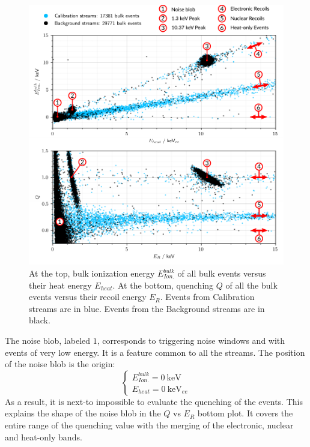 \begin{figure}
\centering
\includegraphics[width=\linewidth,]{Figures/Neutron/ecei_quenching_annotation.pdf}
\caption{At the top, bulk ionization energy $E_{Ion.}^{bulk}$ of all bulk events versus their heat energy $E_{heat}$. At the bottom, quenching $Q$ of all the bulk events versus their recoil energy $E_R$. Events from Calibration streams are in blue. Events from the Background streams are in black.}
\label{fig:ecei-quenching-annotation}
\end{figure}

The noise blob, labeled $1$, corresponds to triggering noise windows and with events of very low energy. It is a feature common to all the streams.
The position of the noise blob is the origin:
\begin{equation}
\begin{cases}
E_{Ion.}^{bulk} = \SI{0}{\kilo\eV} \\
E_{heat} = \SI{0}{\kilo\eV}_{ee}
\end{cases}
\end{equation}
As a result, it is next-to impossible to evaluate the quenching of the events. This explains the shape of the noise blob in the $Q$ vs $E_R$ bottom plot. It covers the entire range of the quenching value with the merging of the electronic, nuclear and heat-only bands.


